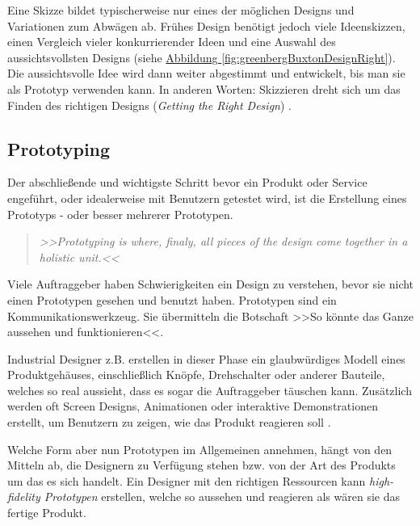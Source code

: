 \medskip Eine Skizze bildet typischerweise nur eines der möglichen Designs und Variationen zum Abwägen ab. Frühes Design benötigt jedoch viele Ideenskizzen, einen Vergleich vieler konkurrierender Ideen und eine Auswahl des aussichtsvollsten Designs (siehe \hyperref[fig:greenbergBuxtonDesignRight]{Abbildung \ref{fig:greenbergBuxtonDesignRight}}). Die aussichtsvolle Idee wird dann weiter abgestimmt und entwickelt, bis man sie als Prototyp verwenden kann. In anderen Worten: Skizzieren dreht sich um das Finden des richtigen Designs (\emph{Getting the Right Design}) \citep{Tohidi:2006, Buxton:2007, Greenberg:2008}. 

\subsection{Prototyping} 
Der abschließende und wichtigste Schritt bevor ein Produkt oder Service engeführt, oder idealerweise mit Benutzern getestet wird, ist die Erstellung eines Prototyps - oder besser mehrerer Prototypen.

\begin{quote}
	\textsl{>>Prototyping is where, finaly, all pieces of the design come together in a holistic unit.<<}
\begin{flushright}\citep{Saffer:2007}\end{flushright}
\end{quote}

Viele Auftraggeber haben Schwierigkeiten ein Design zu verstehen, bevor sie nicht einen Prototypen gesehen und benutzt haben. Prototypen sind ein Kommunikationswerkzeug. Sie übermitteln die Botschaft >>So könnte das Ganze aussehen und funktionieren<<.

\medskip Industrial Designer z.B. erstellen in dieser Phase ein glaubwürdiges Modell eines Produktgehäuses, einschließlich Knöpfe, Drehschalter oder anderer Bauteile, welches so real aussieht, dass es sogar die Auftraggeber täuschen kann. Zusätzlich werden oft Screen Designs, Animationen oder interaktive Demonstrationen erstellt, um Benutzern zu zeigen, wie das Produkt reagieren soll \citep{Vertelney:1990}.

\medskip Welche Form aber nun Prototypen im Allgemeinen annehmen, hängt von den Mitteln ab, die Designern zu Verfügung stehen bzw. von der Art des Produkts um das es sich handelt. Ein Designer mit den richtigen Ressourcen kann \emph{high-fidelity Prototypen} erstellen, welche so aussehen und reagieren als wären sie das fertige Produkt.

